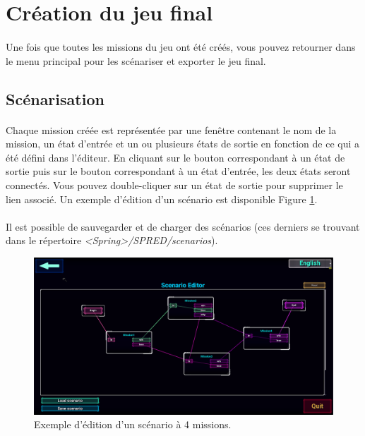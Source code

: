 \documentclass[a4paper]{article}
\begin{document}
\section{Création du jeu final}
\paragraph{ }
Une fois que toutes les missions du jeu ont été créés, vous pouvez retourner dans le menu principal pour les scénariser et exporter le jeu final.
\subsection{Scénarisation}\label{scenario-editor}
\paragraph{ }
Chaque mission créée est représentée par une fenêtre contenant le nom de la mission, un état d'entrée et un ou plusieurs états de sortie en fonction de ce qui a été défini dans l'éditeur. En cliquant sur le bouton correspondant à un état de sortie puis sur le bouton correspondant à un état d'entrée, les deux états seront connectés. Vous pouvez double-cliquer sur un état de sortie pour supprimer le lien associé. Un exemple d'édition d'un scénario est disponible Figure \ref{fig:launcher-scenario}.
\paragraph{ }
Il est possible de sauvegarder et de charger des scénarios (ces derniers se trouvant dans le répertoire \textit{<Spring>/SPRED/scenarios}).
\begin{figure}[H]
\centering
\includegraphics[width=\linewidth]{launcher-scenario.png}
\caption{Exemple d'édition d'un scénario à 4 missions.}
\label{fig:launcher-scenario}
\end{figure}
\end{document}
